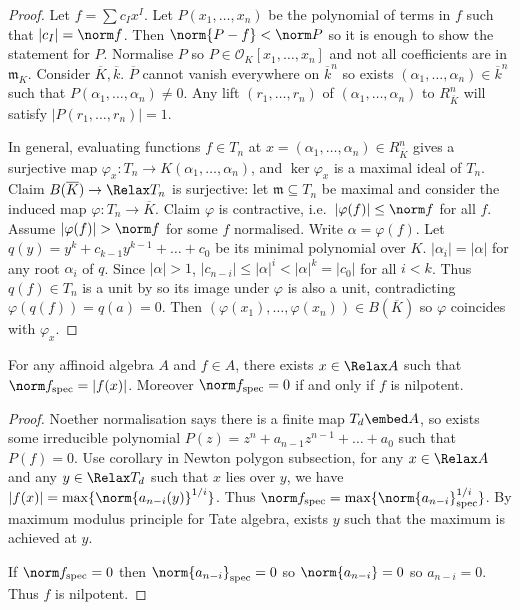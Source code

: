 \documentclass[a4paper]{article}
\renewcommand*{\O}{\mathcal{O}}
\let\Sp\Relax
\DeclareMathOperator{\Sp}{Sp} %
\begin{document}
\begin{proof}
  Let \(f = \sum c_I x^I\). Let \(P(x_1, \dots, x_n)\) be the polynomial of terms in \(f\) such that \(|c_I| = \norm f\). Then \(\norm{P - f} < \norm P\) so it is enough to show the statement for \(P\). Normalise \(P\) so \(P \in \O_K[x_1, \dots, x_n]\) and not all coefficients are in \(\mathfrak m_K\). Consider \(\overline K, \overline k\). \(\overline P\) cannot vanish everywhere on \(\overline k^n\) so exists \((\alpha_1, \dots, \alpha_n) \in \overline k^n\) such that \(P(\alpha_1, \dots, \alpha_n) \ne 0\). Any lift \((r_1, \dots, r_n)\) of \((\alpha_1, \dots, \alpha_n)\) to \(R_{\overline K}^n\) will satisfy \(|P(r_1, \dots, r_n)| = 1\).

  In general, evaluating functions \(f \in T_n\) at \(x = (\alpha_1, \dots, \alpha_n) \in R^n_{\overline K}\) gives a surjective map \(\varphi_x: T_n \to K(\alpha_1, \dots, \alpha_n)\), and \(\ker \varphi_x\) is a maximal ideal of \(T_n\). Claim \(B(\overline K) \to \Sp T_n\) is surjective: let \(\mathfrak m \subseteq T_n\) be maximal and consider the induced map \(\varphi: T_n \to \overline K\). Claim \(\varphi\) is contractive, i.e.\ \(|\varphi(f)| \leq \norm f\) for all \(f\). Assume \(|\varphi(f)| > \norm f\) for some \(f\) normalised. Write \(\alpha = \varphi(f)\). Let \(q(y) = y^k + c_{k - 1} y^{k - 1} + \dots + c_0\) be its minimal polynomial over \(K\). \(|\alpha_i| = |\alpha|\) for any root \(\alpha_i\) of \(q\). Since \(|\alpha| > 1\), \(|c_{n - i}| \leq |\alpha|^i < |\alpha|^k = |c_0|\) for all \(i < k\). Thus \(q(f) \in T_n\) is a unit by  so its image under \(\varphi\) is also a unit, contradicting \(\varphi(q(f)) = q(a) = 0\). Then \((\varphi(x_1), \dots, \varphi(x_n)) \in B(\overline K)\) so \(\varphi\) coincides with \(\varphi_x\).
\end{proof}

\begin{proposition}
  For any affinoid algebra \(A\) and \(f \in A\), there exists \(x \in \Sp A\) such that \(\norm f_{\mathrm{spec}} = |f(x)|\). Moreover \(\norm f_{\mathrm{spec}} = 0\) if and only if \(f\) is nilpotent.
\end{proposition}

\begin{proof}
  Noether normalisation says there is a finite map \(T_d \embed A\), so exists some irreducible polynomial \(P(z) = z^n + a_{n - 1}z^{n - 1} + \dots + a_0\) such that \(P(f) = 0\). Use corollary in Newton polygon subsection, for any \(x \in \Sp A\) and any \(y \in \Sp T_d\) such that \(x\) lies over \(y\), we have \(|f(x)| = \max\{ \norm{a_{n - i}(y)}^{1/i}\}\). Thus \(\norm f_{\mathrm{spec}} = \max \{\norm{a_{n - i}}_{\mathrm{spec}}^{1/i}\}\). By maximum modulus principle for Tate algebra, exists \(y\) such that the maximum is achieved at \(y\).

  If \(\norm f_{\mathrm{spec}} = 0\) then \(\norm{a_{n - i}}_{\mathrm{spec}} = 0\) so \(\norm{a_{n - i}} = 0\) so \(a_{n - i} = 0\). Thus \(f\) is nilpotent.
\end{proof}
\end{document}
